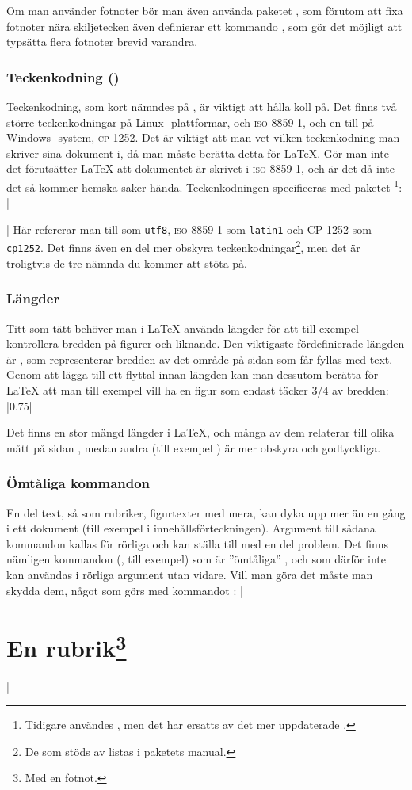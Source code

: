 \documentclass[lang=sv,ptsize=10pt,font=none,nomath,titles=bf,../../a4.tex]{subfiles}
\begin{document}
Om man använder fotnoter bör man även använda paketet , som
förutom att fixa fotnoter nära skiljetecken även definierar ett kommando
, som gör det möjligt att typsätta flera fotnoter brevid
varandra.

\subsubsection{Teckenkodning (\UTF)}
Teckenkodning, som kort nämndes på , är
viktigt att hålla koll på. Det finns två större teckenkodningar på Linux-%
plattformar, \UTF{} och \textsc{iso-8859-1}, och en till på Windows-%
system, \textsc{cp-1252}. Det är viktigt att man vet vilken teckenkodning
man skriver sina dokument i, då man måste berätta detta för \LaTeX. Gör
man inte det förutsätter \LaTeX{} att dokumentet är skrivet i
\textsc{iso-8859-1}, och är det då inte det så kommer hemska saker hända.
Teckenkodningen specificeras med paketet %
\footnote{Tidigare användes , men det har ersatts av det
mer uppdaterade .}:
\latex|\usepackage[<teckenkodning>]{inputenx}|
Här refererar man till \UTF{} som \texttt{utf8}, \textsc{iso-8859-1} som
\texttt{latin1} och \textsc{CP-1252} som \texttt{cp1252}. Det finns även
en del mer obskyra teckenkodningar\footnote{De som stöds av 
 listas i paketets manual.}, men det är troligtvis de tre
nämnda du kommer att stöta på.

\subsubsection{Längder}
Titt som tätt behöver man i \LaTeX{} använda längder för att till exempel
kontrollera bredden på figurer och liknande. Den viktigaste fördefinierade
längden är , som representerar bredden av det område på
sidan som får fyllas med text. Genom att lägga till ett flyttal innan
längden kan man dessutom berätta för \LaTeX{} att man till exempel vill
ha en figur som endast täcker \num{3/4} av bredden:
\latex|0.75\textwidth|

Det finns en stor mängd längder i \LaTeX, och många av dem relaterar till
olika mått på sidan \parencite[132]{Oetiker11}, medan andra (till exempel
) är mer obskyra och godtyckliga.

\subsubsection{Ömtåliga kommandon}
En del text, så som rubriker, figurtexter med mera, kan dyka upp mer än en
gång i ett dokument (till exempel i innehållsförteckningen). Argument till
sådana kommandon kallas för rörliga  och kan ställa
till med en del problem. Det finns nämligen kommandon (,
till exempel) som är ”ömtåliga” , och som därför inte kan
användas i rörliga argument utan vidare. Vill man göra det måste man
skydda dem, något som görs med kommandot :
\latex|\section{En rubrik\protect\footnote{Med en fotnot.}}|
\end{document}
